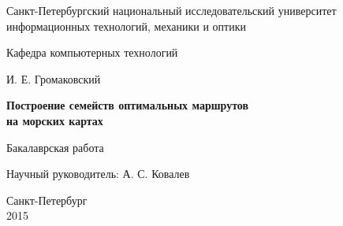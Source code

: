 \documentclass{report}
\theoremstyle{plain}
\theoremstyle{definition}
\numberwithin{theorem}{chapter}        %
\begin{document}

\initializefrontsections

\pagestyle{title}

\begin{center}
Санкт-Петербургский национальный исследовательский университет \\ информационных технологий, механики и оптики

\vspace{2cm}

Кафедра компьютерных технологий

\vspace{3cm}

{\Large И. Е. Громаковский}

\vspace{2cm}

\vbox{\LARGE\bfseries
Построение семейств оптимальных маршрутов \\ на морских картах}

\vspace{4cm}

Бакалаврская работа 

\vspace{1cm}

{\Large Научный руководитель: А. С. Ковалев}

\vspace{5cm}

Санкт-Петербург\\ 2015
\end{center}

\newpage

\setcounter{page}{2}
\pagestyle{plain}



\tableofcontents


\def\t#1{\mbox{\texttt{\hbox{#1}}}}
\def\b#1{\textbf{#1}}
\def\tb#1{\t{\b{#1}}}

\def\cln#1{\t{#1}}
\def\pcn#1{\t{#1}}
\newcommand{\p}{\par Здесь будет текст...}

\def\drawfigure#1#2#3{
        \begin{figure}[ht]
        \centerline{ \texttt{[image: img/\#1]}}
        \caption{#2}
        \label{#3}
        \end{figure}
}
\def\drawfigurex#1#2#3#4{
        \begin{figure}[ht]
        \centerline{ \texttt{[image: img/\#1]}}
        \caption{#2}
        \label{#3}
        \end{figure}
}

\startthechapters




%



\end{document}
